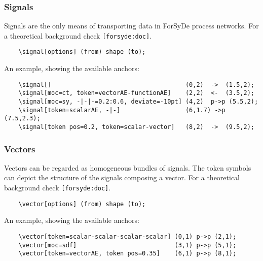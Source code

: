 \documentclass[10pt]{article}
\begin{document}
\subsubsection{Signals}

Signals are the only means of transporting data in ForSyDe process networks. For a theoretical background check \texttt{[forsyde:doc]}. 

\begin{verbatim}
	\signal[options] (from) shape (to);	
\end{verbatim}

An example, showing the available anchors:
\begin{verbatim}
	\signal[]                                     (0,2)  ->  (1.5,2); 
	\signal[moc=ct, token=vectorAE-functionAE]    (2,2)  <-  (3.5,2);
	\signal[moc=sy, -|-|-=0.2:0.6, deviate=-10pt] (4,2)  p->p (5.5,2);
	\signal[token=scalarAE, -|-]                  (6,1.7) ->p (7.5,2.3);
	\signal[token pos=0.2, token=scalar-vector]   (8,2)  ->  (9.5,2);
\end{verbatim}
\begin{figure}[htb!]\centering
{}
\end{figure}

\subsubsection{Vectors}

Vectors can be regarded as homogeneous bundles of signals. The token symbols can depict the structure of the signals composing a vector. For a theoretical background check \texttt{[forsyde:doc]}. 

\begin{verbatim}
	\vector[options] (from) shape (to);	
\end{verbatim}

An example, showing the available anchors:
\begin{verbatim}
	\vector[token=scalar-scalar-scalar-scalar] (0,1) p->p (2,1);	
	\vector[moc=sdf]                           (3,1) p->p (5,1);
	\vector[token=vectorAE, token pos=0.35]    (6,1) p->p (8,1);
\end{verbatim}
\begin{figure}[htb!]\centering
{}
\end{figure}
\end{document}
